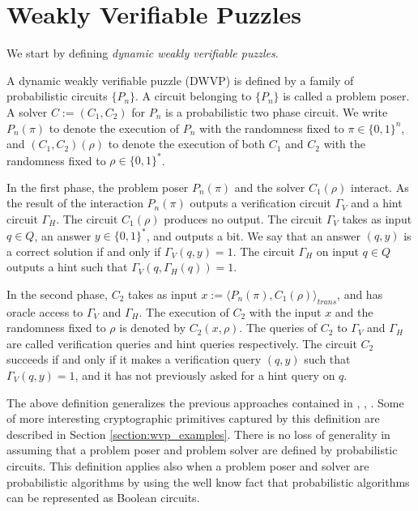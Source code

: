 \documentclass[11pt,a4paper,titlepage]{memoir}
\begin{document}
\section{Weakly Verifiable Puzzles}

We start by defining \textit{dynamic weakly verifiable puzzles}.
\begin{definition}
  \label{def:dwvp}
  A dynamic weakly verifiable puzzle (DWVP) is defined by a family of probabilistic circuits $\{P_n\}$.
  A circuit belonging to $\{P_n\}$ is called a problem poser.
  A solver $C := (C_1, C_2)$ for $P_n$ is a probabilistic two phase circuit.
  We write $P_n(\pi)$ to denote the execution of $P_n$ with the randomness fixed to $\pi \in \{0,1\}^n$, and $(C_1,C_2)(\rho)$
  to denote the execution of both $C_1$ and $C_2$ with the randomness fixed to $\rho \in \{0,1\}^{*}$.

  In the first phase, the problem poser $P_n(\pi)$ and the solver $C_1(\rho)$ interact.
  As the result of the interaction $P_n(\pi)$ outputs a verification circuit $\Gamma_{V}$ and a hint circuit $\Gamma_{H}$.
  The circuit $C_1(\rho)$ produces no output.
  The circuit $\Gamma_{V}$ takes as input $q \in Q$, an answer $y \in \{0,1\}^*$,
  and outputs a bit. We say that an answer $(q,y)$ is a correct solution if and only if $\Gamma_V(q,y) = 1$.
  The circuit $\Gamma_H$ on input $q \in Q$ outputs a hint such that $\Gamma_V(q,\Gamma_H(q)) = 1$.

  In the second phase, $C_2$ takes as input $x := \langle P_n(\pi), C_1(\rho) \rangle_{\mathit{trans}}$,
  and has oracle access to $\Gamma_V$ and $\Gamma_H$.
  The execution of $C_2$ with the input $x$ and the randomness fixed to $\rho$
  is denoted by $C_2(x, \rho)$. The queries of $C_2$ to $\Gamma_V$ and $\Gamma_H$ are called verification queries and hint queries respectively.
  The circuit $C_2$ succeeds if and only if it makes a verification query $(q,y)$ such that $\Gamma_V(q,y) = 1$,
  and it has not previously asked for a hint query on $q$.
\end{definition}

The above definition generalizes the previous approaches contained in \cite{canetti2004hardness}, \cite{Dodis:2009:SAI:1530441.1530450}, \cite{DBLP:journals/corr/abs-1002-3534}.
Some of more interesting cryptographic primitives captured by this definition are described in Section \ref{section:wvp_examples}.
There is no loss of generality in assuming that a problem poser and problem solver are defined by probabilistic circuits.
This definition applies also when a problem poser and solver are probabilistic algorithms
by using the well know fact \cite{LectureNotesCT} that probabilistic algorithms can be represented as Boolean circuits.
\end{document}
